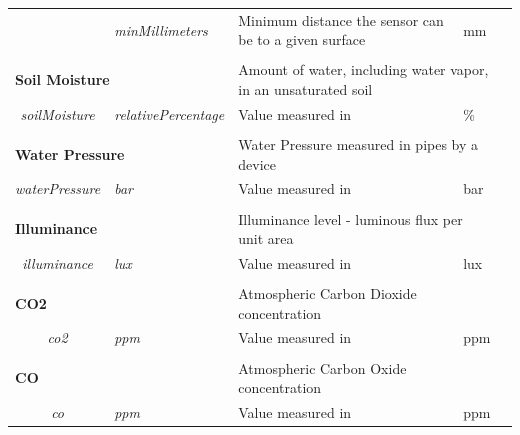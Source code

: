 \begin{landscape}
\begin{longtable}{cllll}
                                         & \textit{minMillimeters}            & Minimum distance the sensor can be to a given surface  & mm                             &  \\ [0.4em] \cline{1-4}
   \\[-0.85em]
   \multicolumn{2}{l}{\textbf{Soil Moisture}}                                 & \multicolumn{2}{l}{Amount of water, including water vapor, in an unsaturated soil}      &  \\
   \textit{soilMoisture}                  & \textit{relativePercentage}        & Value measured in                                      & \%                             &  \\ [0.4em] \cline{1-4}
   \\[-0.85em]
   \multicolumn{2}{l}{\textbf{Water Pressure}}                                & \multicolumn{2}{l}{Water Pressure measured in pipes by a device}                        &  \\
   \textit{waterPressure}                & \textit{bar}                       & Value measured in                                      & bar                            &  \\ [0.4em] \cline{1-4}
   \\[-0.85em]
   \multicolumn{2}{l}{\textbf{Illuminance}}                                   & \multicolumn{2}{l}{Illuminance level - luminous flux per unit area}                     &  \\
   \textit{illuminance}                  & \textit{lux}                       & Value measured in                                      & lux                            &  \\ [0.4em] \cline{1-4}
   \\[-0.85em]
   \multicolumn{2}{l}{\textbf{CO2}}                                           & \multicolumn{2}{l}{Atmospheric Carbon Dioxide concentration}                            &  \\
   \textit{co2}                          & \textit{ppm}                       & Value measured in                                      & ppm                            &  \\ [0.4em] \cline{1-4}
   \\[-0.85em]
   \multicolumn{2}{l}{\textbf{CO}}                                            & \multicolumn{2}{l}{Atmospheric Carbon Oxide concentration}                              &  \\
   \textit{co}                           & \textit{ppm}                       & Value measured in                                      & ppm                            &  \\ [0.4em] \cline{1-4}

\end{longtable}
\end{landscape}
